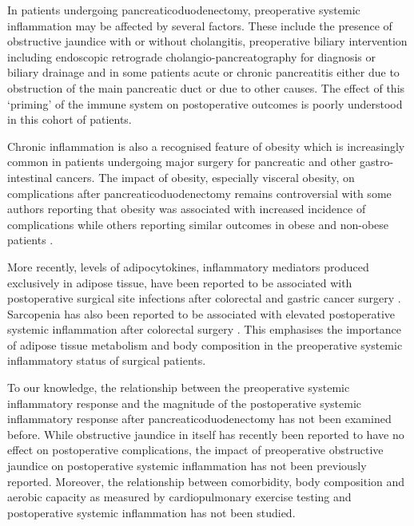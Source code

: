 In patients undergoing pancreaticoduodenectomy, preoperative systemic inflammation may be affected by several factors. 
These include the presence of obstructive jaundice with or without cholangitis, preoperative biliary intervention including endoscopic retrograde cholangio-pancreatography for diagnosis or biliary drainage and in some patients acute or chronic pancreatitis either due to obstruction of the main pancreatic duct or due to other causes. 
The effect of this `priming' of the immune system on postoperative outcomes is poorly understood in this cohort of patients. 

Chronic inflammation is also a recognised feature of obesity which is increasingly common in patients undergoing major surgery for pancreatic and other gastro-intestinal cancers. 
The impact of obesity, especially visceral obesity, on complications after pancreaticoduodenectomy remains controversial with some authors reporting that obesity was associated with increased incidence of complications \parencite{house_preoperative_2008, ramsey_body_2011} while others reporting similar outcomes in obese and non-obese patients \parencite{khan_does_2010, tsai_impact_2010, balentine_obesity_2011}. 

More recently, levels of adipocytokines, inflammatory mediators produced exclusively in adipose tissue, have been reported to be associated with postoperative surgical site infections after colorectal \parencite{ortega-deballon_preoperative_2013, matsuda_preoperative_2009} and gastric cancer surgery \parencite{yamamoto_association_2013}.
Sarcopenia has also been reported to be associated with  elevated postoperative systemic inflammation after colorectal surgery \parencite{reisinger_sarcopenia_2015}.
This emphasises the importance of adipose tissue metabolism and body composition in the preoperative systemic inflammatory status of surgical patients. 

To our knowledge, the relationship between the preoperative systemic inflammatory response and the magnitude of the postoperative systemic inflammatory response after pancreaticoduodenectomy has not been examined before. 
While obstructive jaundice in itself has recently been reported to have no effect on postoperative complications, the impact of preoperative obstructive jaundice on postoperative systemic inflammation has not been previously reported. 
Moreover, the relationship between comorbidity, body composition and aerobic capacity as measured by cardiopulmonary exercise testing and postoperative systemic inflammation has not been studied. 

